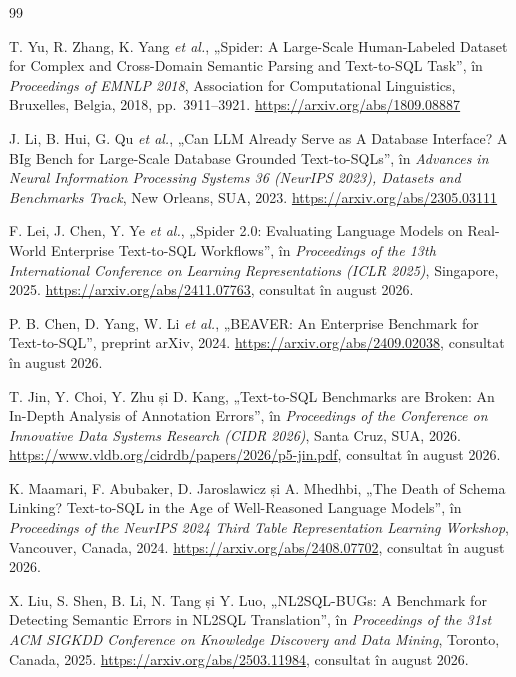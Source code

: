 \documentclass[12pt,a4paper]{report}
\begin{document}
\begin{thebibliography}{99}

T. Yu, R. Zhang, K. Yang \emph{et al.}, „Spider: A Large-Scale Human-Labeled
Dataset for Complex and Cross-Domain Semantic Parsing and Text-to-SQL Task”,
în \emph{Proceedings of EMNLP 2018}, Association for Computational
Linguistics, Bruxelles, Belgia, 2018, pp.\ 3911--3921.
\url{https://arxiv.org/abs/1809.08887}

J. Li, B. Hui, G. Qu \emph{et al.}, „Can LLM Already Serve as A Database
Interface? A BIg Bench for Large-Scale Database Grounded Text-to-SQLs”, în
\emph{Advances in Neural Information Processing Systems 36 (NeurIPS 2023),
Datasets and Benchmarks Track}, New Orleans, SUA, 2023.
\url{https://arxiv.org/abs/2305.03111}

F. Lei, J. Chen, Y. Ye \emph{et al.}, „Spider 2.0: Evaluating Language Models
on Real-World Enterprise Text-to-SQL Workflows”, în \emph{Proceedings of the
13th International Conference on Learning Representations (ICLR 2025)},
Singapore, 2025. \url{https://arxiv.org/abs/2411.07763}, consultat în august
2026.

P. B. Chen, D. Yang, W. Li \emph{et al.}, „BEAVER: An Enterprise Benchmark
for Text-to-SQL”, preprint arXiv, 2024.
\url{https://arxiv.org/abs/2409.02038}, consultat în august 2026.

T. Jin, Y. Choi, Y. Zhu și D. Kang, „Text-to-SQL Benchmarks are Broken: An
In-Depth Analysis of Annotation Errors”, în \emph{Proceedings of the
Conference on Innovative Data Systems Research (CIDR 2026)}, Santa Cruz,
SUA, 2026. \url{https://www.vldb.org/cidrdb/papers/2026/p5-jin.pdf},
consultat în august 2026.

K. Maamari, F. Abubaker, D. Jaroslawicz și A. Mhedhbi, „The Death of Schema
Linking? Text-to-SQL in the Age of Well-Reasoned Language Models”, în
\emph{Proceedings of the NeurIPS 2024 Third Table Representation Learning
Workshop}, Vancouver, Canada, 2024.
\url{https://arxiv.org/abs/2408.07702}, consultat în august 2026.

X. Liu, S. Shen, B. Li, N. Tang și Y. Luo, „NL2SQL-BUGs: A Benchmark for
Detecting Semantic Errors in NL2SQL Translation”, în \emph{Proceedings of the
31st ACM SIGKDD Conference on Knowledge Discovery and Data Mining}, Toronto,
Canada, 2025. \url{https://arxiv.org/abs/2503.11984}, consultat în august
2026.


\end{thebibliography}
\end{document}
